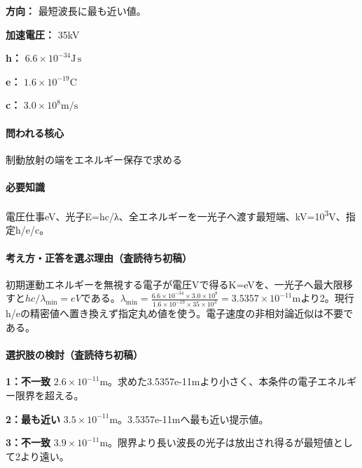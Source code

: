 \noindent\textbf{方向：} 最短波長に最も近い値。\par

\noindent\textbf{加速電圧：} 35kV\par

\noindent\textbf{h：} \(6.6\times10^{-34}\mathrm{J\,s}\)\par

\noindent\textbf{e：} \(1.6\times10^{-19}\mathrm{C}\)\par

\noindent\textbf{c：} \(3.0\times10^8\mathrm{m/s}\)\par

\paragraph{問われる核心} 制動放射の端をエネルギー保存で求める

\paragraph{必要知識} 電圧仕事eV、光子E=\allowbreak{}hc/λ、全エネルギーを一光子へ渡す最短端、kV=\allowbreak{}10\textsuperscript{3}V、指定h/e/c。

\paragraph{考え方・正答を選ぶ理由（査読待ち初稿）} 初期運動エネルギーを無視する電子が電圧Vで得るK=\allowbreak{}eVを、一光子へ最大限移すと\(hc/\lambda_{\min}=eV\)である。\(\lambda_{\min}=\frac{6.6\times10^{-34}\times3.0\times10^8}{1.6\times10^{-19}\times35\times10^3}=3.5357\times10^{-11}\mathrm{m}\)より2。現行h/eの精密値へ置き換えず指定丸め値を使う。電子速度の非相対論近似は不要である。

\paragraph{選択肢の検討（査読待ち初稿）}\mbox{}\par

\noindent\textbf{1：不一致} \(2.6\times10^{-11}\mathrm{m}\)。求めた3.5357e-11mより小さく、本条件の電子エネルギー限界を超える。\par

\noindent\textbf{2：最も近い} \(3.5\times10^{-11}\mathrm{m}\)。3.5357e-11mへ最も近い提示値。\par

\noindent\textbf{3：不一致} \(3.9\times10^{-11}\mathrm{m}\)。限界より長い波長の光子は放出され得るが最短値として2より遠い。\par

